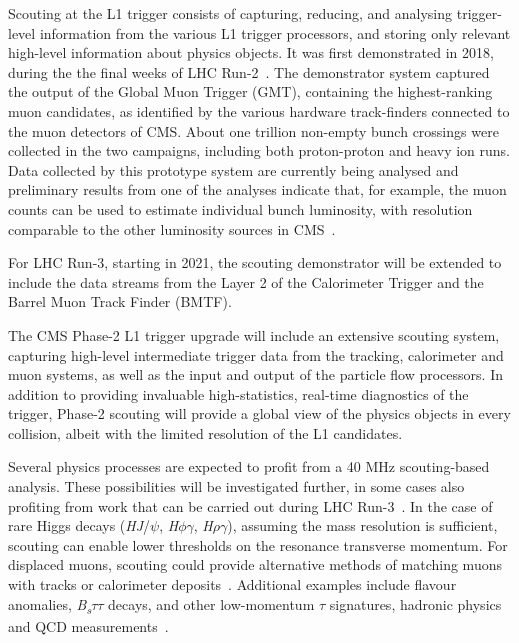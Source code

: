 \documentclass[10pt, paper=a4, UKenglish]{article}
\begin{document}
Scouting at the L1 trigger consists of capturing, reducing, and analysing trigger-level information from the various L1 trigger processors, and storing only relevant high-level information about physics objects. It was first demonstrated in 2018, during the the final weeks of LHC Run-2~\cite{hannes}. The demonstrator system captured the output of the Global Muon Trigger (GMT), containing the highest-ranking muon candidates, as identified by the various hardware track-finders connected to the muon detectors of CMS. About one trillion non-empty bunch crossings were collected in the two campaigns, including both proton-proton and heavy ion runs. Data collected by this prototype system are currently being analysed and preliminary results from one of the analyses indicate that, for example, the muon counts can be used to estimate individual bunch luminosity, with resolution comparable to the other luminosity sources in CMS~\cite{tdr, lumi}.

For LHC Run-3, starting in 2021, the scouting demonstrator will be extended to include the data streams from the Layer 2 of the Calorimeter Trigger and the Barrel Muon Track Finder (BMTF).

The CMS Phase-2 L1 trigger upgrade will include an extensive scouting system, capturing high-level intermediate trigger data from the tracking, calorimeter and muon systems, as well as the input and output of the particle flow processors. In addition to providing invaluable high-statistics, real-time diagnostics of the trigger, Phase-2 scouting will provide a global view of the physics objects in every collision, albeit with the limited resolution of the L1 candidates.


Several physics processes are expected to profit from a 40 MHz scouting-based analysis. These possibilities will be investigated further, in some cases also profiting from work that can be carried out during LHC Run-3~\cite{tdr}. In the case of rare Higgs decays (\textit{H}\textrightarrow \textit{J}/$\psi$, \textit{H}\textrightarrow $\phi\gamma$, \textit{H}\textrightarrow $\rho\gamma$), assuming the mass resolution is sufficient, scouting can enable lower thresholds on the resonance transverse momentum. For displaced muons, scouting could provide alternative methods of matching muons with tracks or calorimeter deposits~\cite{hannes}. Additional examples include flavour anomalies, \textit{B\textsubscript{s}}\textrightarrow $\tau\tau$ decays, and other low-momentum $\tau$ signatures, hadronic physics and QCD measurements~\cite{tdr}.
\end{document}

